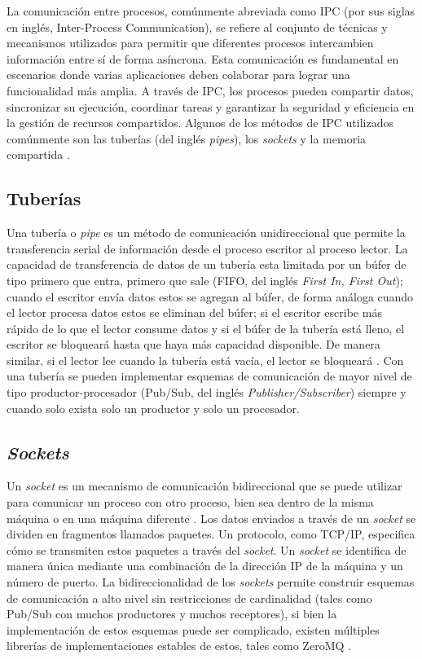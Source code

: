 La comunicación entre procesos, comúnmente abreviada como IPC (por sus siglas en inglés, Inter-Process Communication), se refiere al conjunto de técnicas y mecanismos utilizados para permitir que diferentes procesos intercambien información entre sí de forma asíncrona. Esta comunicación es fundamental en escenarios donde varias aplicaciones deben colaborar para lograr una funcionalidad más amplia. A través de IPC, los procesos pueden compartir datos, sincronizar su ejecución, coordinar tareas y garantizar la seguridad y eficiencia en la gestión de recursos compartidos. Algunos de los métodos de IPC utilizados comúnmente son las tuberías (del inglés \textit{pipes}), los \textit{sockets} y la memoria compartida \cite{IPCEval2015}.

\subsection{Tuberías}

Una tubería o \textit{pipe} es un método de comunicación unidireccional que permite la transferencia serial de información desde el proceso escritor al proceso lector. La capacidad de transferencia de datos de un tubería esta limitada por un búfer de tipo primero que entra, primero que sale (FIFO, del inglés \textit{First In, First Out}); cuando el escritor envía datos estos se agregan al búfer, de forma análoga cuando el lector procesa datos estos se eliminan del búfer; si el escritor escribe más rápido de lo que el lector consume datos y si el búfer de la tubería está lleno, el escritor se bloqueará hasta que haya más capacidad disponible. De manera similar, si el lector lee cuando la tubería está vacía, el lector se bloqueará \cite{IPCEval2015}. Con una tubería se pueden implementar esquemas de comunicación de mayor nivel de tipo productor-procesador (Pub/Sub, del inglés \textit{Publisher/Subscriber}) siempre y cuando solo exista solo un productor y solo un procesador.

\subsection{\textit{Sockets}}

Un \textit{socket} es un mecanismo de comunicación bidireccional que se puede utilizar para comunicar un proceso con otro proceso, bien sea dentro de la misma máquina o en una máquina diferente \cite{IPCEval2015}. Los datos enviados a través de un \textit{socket} se dividen en fragmentos llamados paquetes. Un protocolo, como TCP/IP, especifica cómo se transmiten estos paquetes a través del \textit{socket}. Un \textit{socket} se identifica de manera única mediante una combinación de la dirección IP de la máquina y un número de puerto. La bidireccionalidad de los \textit{sockets} permite construir esquemas de comunicación a alto nivel sin restricciones de cardinalidad (tales como Pub/Sub con muchos productores y muchos receptores), si bien la implementación de estos esquemas puede ser complicado,  existen múltiples librerías de implementaciones estables de estos, tales como ZeroMQ \cite{zeroMQ}.

